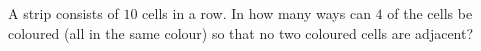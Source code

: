 A strip consists of $10$ cells in a row. In how many ways can $4$ of the cells be coloured (all in the same colour) so that no two coloured cells are adjacent?
